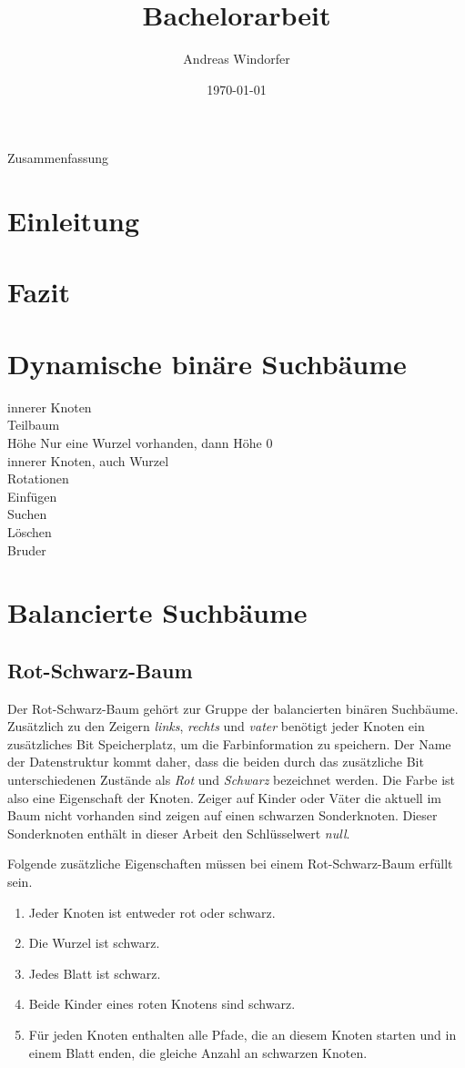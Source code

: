 \documentclass[a4paper,12pt]{article}
\title{Bachelorarbeit}
\author{

	Andreas Windorfer\\
}
\date{\today}
\begin{document}
\maketitle
\newpage
Zusammenfassung
\newpage
\tableofcontents


\newpage

\section {Einleitung}
\section{Fazit}
\section{Dynamische binäre Suchbäume}
innerer Knoten\\
Teilbaum\\
Höhe Nur eine Wurzel vorhanden, dann Höhe 0\\
innerer Knoten, auch Wurzel\\
Rotationen\\
Einfügen\\
Suchen\\
Löschen\\
Bruder\\
\section{Balancierte Suchbäume}
\subsection{Rot-Schwarz-Baum}
Der Rot-Schwarz-Baum gehört zur Gruppe der balancierten binären Suchbäume. Zusätzlich zu den Zeigern \textit{links}, \textit{rechts} und \textit{vater} benötigt jeder Knoten ein zusätzliches Bit Speicherplatz, um die Farbinformation zu speichern. Der Name der Datenstruktur kommt daher, dass die beiden durch das zusätzliche Bit unterschiedenen Zustände als \textit{Rot} und \textit{Schwarz} bezeichnet werden. Die Farbe ist also eine Eigenschaft der Knoten. Zeiger auf Kinder oder Väter die aktuell im Baum nicht vorhanden sind zeigen auf einen schwarzen Sonderknoten. Dieser Sonderknoten enthält in dieser Arbeit den Schlüsselwert \textit{null}.  


\noindent Folgende zusätzliche Eigenschaften müssen bei einem Rot-Schwarz-Baum erfüllt sein. 

\begin{enumerate}
	\item Jeder Knoten ist entweder rot oder schwarz.
	\item Die Wurzel ist schwarz.
	\item Jedes Blatt ist schwarz.
	\item Beide Kinder eines roten Knotens sind schwarz.
	\item Für jeden Knoten enthalten alle Pfade, die an diesem Knoten starten und in einem Blatt enden, die gleiche Anzahl an schwarzen Knoten. 
\end{enumerate}  
\end{document}

